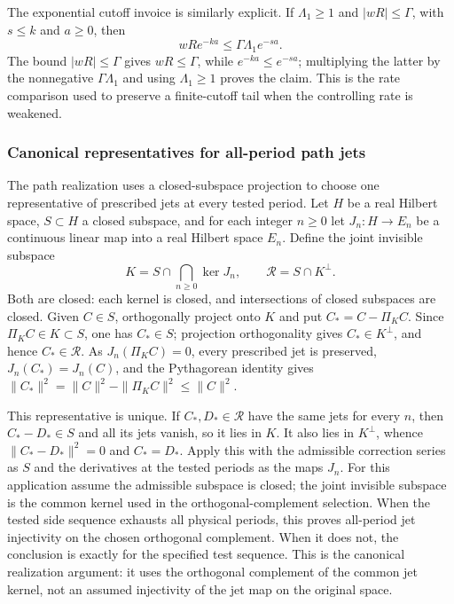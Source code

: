 The exponential cutoff invoice is similarly explicit. If $\Lambda_1\geq1$
and $|wR|\leq\Gamma$, with $s\leq k$ and $a\geq0$, then
\begin{equation}
 wR e^{-ka}\leq \Gamma\Lambda_1 e^{-sa}.
 \label{eq:path-cutoff-invoice}
\end{equation}
The bound $|wR|\leq\Gamma$ gives $wR\leq\Gamma$, while
$e^{-ka}\leq e^{-sa}$; multiplying the latter by the nonnegative
$\Gamma\Lambda_1$ and using $\Lambda_1\geq1$ proves the claim. This is the
rate comparison used to preserve a finite-cutoff tail when the controlling
rate is weakened.

\subsubsection{Canonical representatives for all-period path jets}
\label{subsec:path-vow-representatives}

The path realization uses a closed-subspace projection to choose one
representative of prescribed jets at every tested period. Let $H$ be a real
Hilbert space, $S\subset H$ a closed subspace, and for each integer $n\geq0$
let $J_n:H\to E_n$ be a continuous linear map into a real Hilbert space
$E_n$. Define the joint invisible subspace
\[
 K=S\cap\bigcap_{n\geq0}\ker J_n,
 \qquad \mathcal R=S\cap K^\perp.
\]
Both are closed: each kernel is closed, and intersections of closed subspaces
are closed. Given $C\in S$, orthogonally project onto $K$ and put
$C_* = C-\Pi_K C$. Since $\Pi_K C\in K\subset S$, one has $C_*\in S$;
projection orthogonality gives $C_*\in K^\perp$, and hence $C_*\in\mathcal R$.
As $J_n(\Pi_K C)=0$, every prescribed jet is preserved,
$J_n(C_*)=J_n(C)$, and the Pythagorean identity gives
$\|C_*\|^2=\|C\|^2-\|\Pi_K C\|^2\leq\|C\|^2$.

This representative is unique. If $C_*,D_*\in\mathcal R$ have the same
jets for every $n$, then $C_*-D_*\in S$ and all its jets vanish, so it lies
in $K$. It also lies in $K^\perp$, whence
$\|C_*-D_*\|^2=0$ and $C_*=D_*$. Apply this with the admissible correction
series as $S$ and the derivatives at the tested periods as the maps $J_n$.
For this application assume the admissible subspace is closed; the joint invisible subspace is the common kernel used in the orthogonal-complement selection.
When the tested side sequence exhausts all physical periods, this proves
all-period jet injectivity on the chosen orthogonal complement. When it does
not, the conclusion is exactly for the specified test sequence. This is the
canonical realization argument: it uses the orthogonal complement of the
common jet kernel, not an assumed injectivity of the jet map on the original
space.

